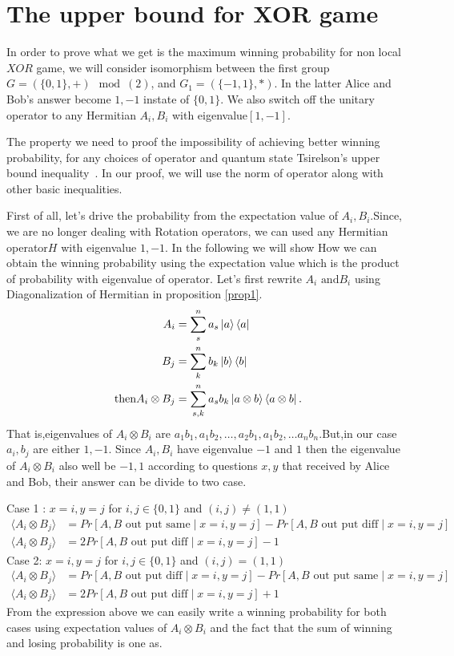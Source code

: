 \section{The upper bound for XOR game}\hfill \break
In order to prove what we get is the maximum winning  probability for  non local $XOR$ game, we will consider isomorphism between  the first group $G=(\{0,1\},+) \mod(2)$, and $ G_1=(\{-1,1\},*)$. In the latter Alice and Bob's answer become ${1,-1}$ instate of $\{0,1\}$. We also switch off the unitary operator to any Hermitian $A_i,B_i$ with eigenvalue$[1,-1]$.

The property we need to proof the impossibility of achieving better  winning probability, for any choices of operator and quantum state Tsirelson’s  upper bound inequality~\citep{Cirel'son1980}.
In our proof, we will use the norm of operator along with other basic inequalities.

First of all, let's drive the probability from the expectation value of $A_i,B_i$.Since, we are no longer dealing with Rotation operators, we can used any Hermitian  operator$H$ with eigenvalue $1,-1$. In the following we will show How we can obtain the winning probability using the expectation value which is the product  of probability with  eigenvalue of operator.
Let's first rewrite $A_i\text{ and} B_i$ using  Diagonalization of Hermitian in proposition \ref{prop1}.
\begin{align}\label{NEED}
A_i&=\sum_s^n a_s \ket{a}\bra{a}\nonumber\\
B_j&=\sum_k^n  b_k \ket{b}\bra{b}\nonumber\\
\text{then} A_i\otimes B_j&=\sum_{s,k}^n  a_s b_k \ket{a\otimes b}\bra{a \otimes b}.
\end{align}
That is,eigenvalues of $A_i\otimes B_i$ are $a_1 b_1 ,a_1b_2,\dots,a_2 b_1,a_1 b_2,\ldots a_n b_n$.But,in our case $a_i,b_j$ are either $1,-1$. Since $A_i, B_i$  have eigenvalue $-1$ and $1$ then the eigenvalue of $A_i\otimes B_i$ also well be $-1,1$ according to  questions $x,y$  that received by Alice and Bob, their answer can be divide to two case.

Case 1 :
$x=i,y=j$ for $i,j\in \{0,1\}$ and $(i,j)\neq (1,1)$
\begin{align}
\langle A_i\otimes B_j \rangle&=Pr[A,B \text{ out put same} \mid  x=i,y=j]-Pr[A,B \text{ out put diff}  \mid  x=i,y=j]\\
\langle A_i\otimes B_j\rangle &=2Pr[A,B \text{ out put diff} \mid  x=i,y=j]-1
\end{align}
Case 2:
$x=i,y=j$ for $i,j\in \{0,1\}$ and $(i,j)= (1,1)$
\begin{align}
\langle A_i\otimes B_j\rangle &=Pr[A,B \text{ out put diff} \mid  x=i,y=j]-Pr[A,B \text{ out put same}  \mid  x=i,y=j]\\
\langle A_i\otimes B_j\rangle&=2Pr[A,B \text{ out put diff} \mid  x=i,y=j]+1
\end{align}
From the expression above we can easily write a winning probability for both cases using expectation values of $A_i\otimes B_i$ and the fact that the sum of winning and losing probability  is one as.

